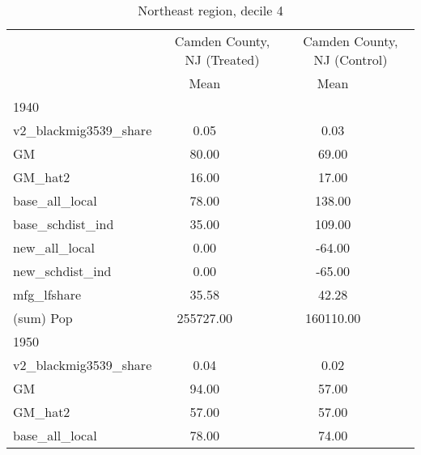 \begin{table}[htbp]\centering
\def\sym#1{\ifmmode^{#1}\else\(^{#1}\)\fi}
\caption{Northeast region, decile 4 \label{tab1}}
\begin{tabular}{l*{2}{ccc}}
\toprule
                    &\multicolumn{3}{c}{Camden County, NJ (Treated)}&\multicolumn{3}{c}{Camden County, NJ (Control)}\\
                    &        Mean&            &            &        Mean&            &            \\
\midrule
1940                &            &            &            &            &            &            \\
v2\_blackmig3539\_share&        0.05&            &            &        0.03&            &            \\
GM                  &       80.00&            &            &       69.00&            &            \\
GM\_hat2             &       16.00&            &            &       17.00&            &            \\
base\_all\_local      &       78.00&            &            &      138.00&            &            \\
base\_schdist\_ind    &       35.00&            &            &      109.00&            &            \\
new\_all\_local       &        0.00&            &            &      -64.00&            &            \\
new\_schdist\_ind     &        0.00&            &            &      -65.00&            &            \\
mfg\_lfshare         &       35.58&            &            &       42.28&            &            \\
(sum) Pop           &   255727.00&            &            &   160110.00&            &            \\
\midrule
1950                &            &            &            &            &            &            \\
v2\_blackmig3539\_share&        0.04&            &            &        0.02&            &            \\
GM                  &       94.00&            &            &       57.00&            &            \\
GM\_hat2             &       57.00&            &            &       57.00&            &            \\
base\_all\_local      &       78.00&            &            &       74.00&            &            \\

\end{tabular}
\end{table}
